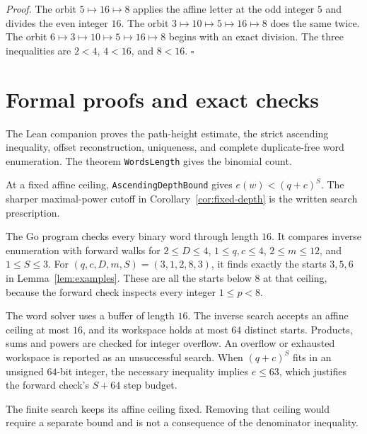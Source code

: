 \documentclass[11pt,letterpaper]{article}
\newenvironment{proof}{\noindent\textit{Proof.}}{\hfill\(\square\)}
\begin{document}
\begin{proof}
The orbit \(5\mapsto 16\mapsto 8\) applies the affine letter at the odd integer \(5\) and divides the even integer \(16\). The orbit \(3\mapsto 10\mapsto 5\mapsto 16\mapsto 8\) does the same twice. The orbit \(6\mapsto 3\mapsto 10\mapsto 5\mapsto 16\mapsto 8\) begins with an exact division. The three inequalities are \(2<4\), \(4<16\), and \(8<16\).
\end{proof}

\section{Formal proofs and exact checks}

The Lean companion proves the path-height estimate, the strict ascending
inequality, offset reconstruction, uniqueness, and complete duplicate-free
word enumeration. The theorem \texttt{WordsLength} gives the binomial count.

At a fixed affine ceiling, \texttt{AscendingDepthBound} gives
\(e(w)<(q+c)^S\). The sharper maximal-power cutoff in
Corollary~\ref{cor:fixed-depth} is the written search prescription.

The Go program checks every binary word through length \(16\). It compares
inverse enumeration with forward walks for \(2\le D\le4\),
\(1\le q,c\le4\), \(2\le m\le12\), and \(1\le S\le3\).
For \((q,c,D,m,S)=(3,1,2,8,3)\), it finds exactly the starts \(3,5,6\)
in Lemma~\ref{lem:examples}. These are all the starts below \(8\) at that
ceiling, because the forward check inspects every integer \(1\le p<8\).

The word solver uses a buffer of length \(16\). The inverse search accepts
an affine ceiling at most \(16\), and its workspace holds at most \(64\)
distinct starts. Products, sums and powers are checked for integer overflow.
An overflow or exhausted workspace is reported as an unsuccessful search.
When \((q+c)^S\) fits in an unsigned \(64\)-bit integer, the necessary
inequality implies \(e\le63\), which justifies the forward check's
\(S+64\) step budget.

The finite search keeps its affine ceiling fixed. Removing that ceiling
would require a separate bound and is not a consequence of the denominator
inequality.
\end{document}
